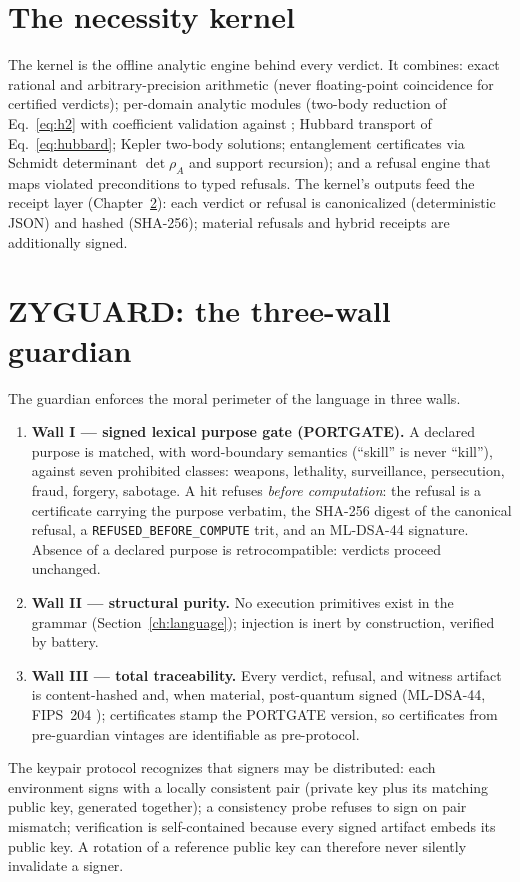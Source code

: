 \documentclass[11pt,a4paper]{report}
\begin{document}
\chapter{The necessity kernel}
\label{ch:kernel}

The kernel is the offline analytic engine behind every verdict. It
combines: exact rational and arbitrary-precision arithmetic (never
floating-point coincidence for certified verdicts); per-domain analytic
modules (two-body reduction of Eq.~\eqref{eq:h2} with coefficient
validation against \citet{omalley2016}; Hubbard transport of
Eq.~\eqref{eq:hubbard}; Kepler two-body solutions; entanglement
certificates via Schmidt determinant $\det \rho_A$ and support recursion);
and a refusal engine that maps violated preconditions to typed refusals.
The kernel's outputs feed the receipt layer (Chapter~\ref{ch:zyguard}):
each verdict or refusal is canonicalized (deterministic JSON) and hashed
(SHA-256); material refusals and hybrid receipts are additionally signed.

\chapter{ZYGUARD: the three-wall guardian}
\label{ch:zyguard}

The guardian enforces the moral perimeter of the language in three walls.
\begin{enumerate}
  \item \textbf{Wall I --- signed lexical purpose gate (PORTGATE).}
        A declared purpose is matched, with word-boundary semantics
        (``skill'' is never ``kill''), against seven prohibited classes:
        weapons, lethality, surveillance, persecution, fraud, forgery,
        sabotage. A hit refuses \emph{before computation}: the refusal is
        a certificate carrying the purpose verbatim, the SHA-256 digest of
        the canonical refusal, a \texttt{REFUSED\_BEFORE\_COMPUTE} trit, and
        an ML-DSA-44 signature. Absence of a declared purpose is
        retrocompatible: verdicts proceed unchanged.
  \item \textbf{Wall II --- structural purity.} No execution primitives
        exist in the grammar (Section~\ref{ch:language}); injection is
        inert by construction, verified by battery.
  \item \textbf{Wall III --- total traceability.} Every verdict, refusal,
        and witness artifact is content-hashed and, when material,
        post-quantum signed (ML-DSA-44, FIPS~204 \citep{fips204});
        certificates stamp the PORTGATE version, so certificates from
        pre-guardian vintages are identifiable as pre-protocol.
\end{enumerate}
The keypair protocol recognizes that signers may be distributed: each
environment signs with a locally consistent pair (private key plus its
matching public key, generated together); a consistency probe refuses to
sign on pair mismatch; verification is self-contained because every
signed artifact embeds its public key. A rotation of a reference public
key can therefore never silently invalidate a signer.
\end{document}
